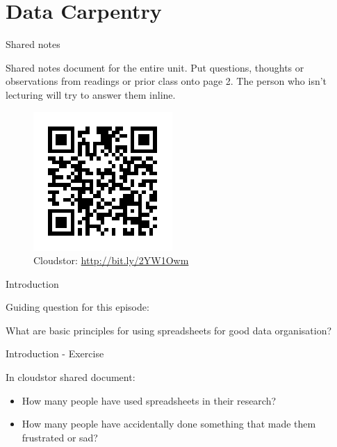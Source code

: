 \documentclass[aspectratio=43, 11pt]{beamer} %
\begin{document}
\section{Data Carpentry}
\begin{frame}{Shared notes}

Shared notes document for the entire unit. Put questions, thoughts or observations from readings or prior class onto page 2. The person who isn't lecturing will try to answer them inline.



    \begin{figure}[H]
        \centering
        \includegraphics[height=.6\textheight]{figures/cloudstorqr.png}
        \caption{Cloudstor: \url{http://bit.ly/2YW1Owm}}
        \label{fig:programmed}
    \end{figure}


\end{frame}


\begin{frame}{Introduction}

Guiding question for this episode: 

What are basic principles for using spreadsheets for good data organisation?


\end{frame}
\begin{frame}{Introduction - Exercise}

In cloudstor shared document:
\begin{itemize}[label=\textbullet]
\item How many people have used spreadsheets in their research?
\item How many people have accidentally done something that made them frustrated or sad?
\end{itemize}

\end{frame}
\end{document}

